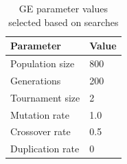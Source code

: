 \begin{table}
    \centering
    \begin{tabular}{| l | l |}
    \hline
    \textbf{Parameter} & \textbf{Value} \\ \hline
    Population size & 800 \\
    \hline
    Generations & 200 \\
    \hline
    Tournament size & 2 \\
    \hline
    Mutation rate & 1.0 \\
    \hline
    Crossover rate & 0.5 \\
    \hline
    Duplication rate & 0 \\
    \hline
    \end{tabular}
    \caption[GE parameter values selected based on searches]{\gls{GE} parameter values selected based on searches}
    \label{tab:ge-parameters}
\end{table}

